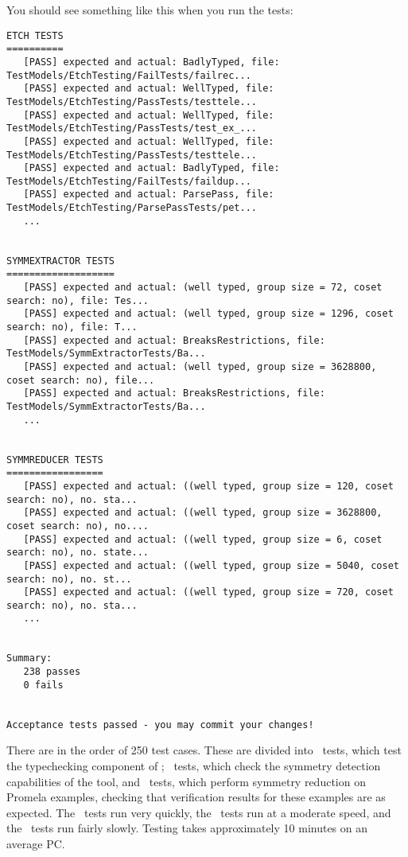 You should see something like this when you run the tests:
%
\begin{lstlisting}
ETCH TESTS
==========
   [PASS] expected and actual: BadlyTyped, file: TestModels/EtchTesting/FailTests/failrec...
   [PASS] expected and actual: WellTyped, file: TestModels/EtchTesting/PassTests/testtele...
   [PASS] expected and actual: WellTyped, file: TestModels/EtchTesting/PassTests/test_ex_...
   [PASS] expected and actual: WellTyped, file: TestModels/EtchTesting/PassTests/testtele...
   [PASS] expected and actual: BadlyTyped, file: TestModels/EtchTesting/FailTests/faildup...
   [PASS] expected and actual: ParsePass, file: TestModels/EtchTesting/ParsePassTests/pet...
   ...


SYMMEXTRACTOR TESTS
===================
   [PASS] expected and actual: (well typed, group size = 72, coset search: no), file: Tes...
   [PASS] expected and actual: (well typed, group size = 1296, coset search: no), file: T...
   [PASS] expected and actual: BreaksRestrictions, file: TestModels/SymmExtractorTests/Ba...
   [PASS] expected and actual: (well typed, group size = 3628800, coset search: no), file...
   [PASS] expected and actual: BreaksRestrictions, file: TestModels/SymmExtractorTests/Ba...
   ...


SYMMREDUCER TESTS
=================
   [PASS] expected and actual: ((well typed, group size = 120, coset search: no), no. sta...
   [PASS] expected and actual: ((well typed, group size = 3628800, coset search: no), no....
   [PASS] expected and actual: ((well typed, group size = 6, coset search: no), no. state...
   [PASS] expected and actual: ((well typed, group size = 5040, coset search: no), no. st...
   [PASS] expected and actual: ((well typed, group size = 720, coset search: no), no. sta...
   ...


Summary:
   238 passes
   0 fails


Acceptance tests passed - you may commit your changes!
\end{lstlisting}
%
There are in the order of 250 test cases.  These are divided into
\etch\ tests, which test the typechecking component of \topspin;
\symmextractor\ tests, which check the symmetry detection
capabilities of the tool, and \symmreducer\
tests, which perform symmetry reduction on Promela examples, checking
that verification results for these examples are as expected.
The \etch\ tests run very quickly, the \symmextractor\ tests run
at a moderate speed, and the \symmreducer\ tests run fairly slowly.
Testing takes approximately 10 minutes on an average PC.


